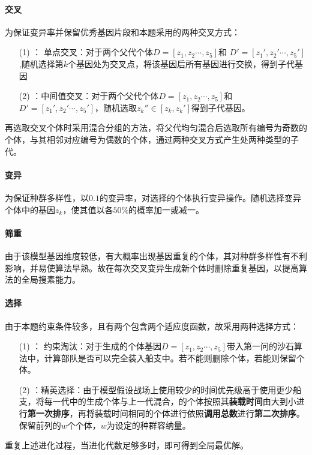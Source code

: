 \documentclass{whutmod}
\begin{document}
	 \paragraph{交叉}
	 为保证变异率并保留优秀基因片段和本题采用的两种交叉方式：
	\begin{itemize}
	\item [(1)]： 单点交叉：对于两个父代个体$D=[z_{1},z_{2}\cdots,z_{5}]$和	$D'=[z_{1}',z_{2}'\cdots,z_{5}']$,随机选择第$k$个基因处为交叉点，将该基因后所有基因进行交换，得到子代基因
	\item [(2)]：中间值交叉：对于两个父代个体$D=[z_{1},z_{2}\cdots,z_{5}]$和	$D'=[z_{1}',z_{2}'\cdots,z_{5}']$，随机选取$z_{k}''\in [z_{k},z_{k}']$得到子代基因。
    \end{itemize}
    再选取交叉个体时采用混合分组的方法，将父代均匀混合后选取所有编号为奇数的个体，与其相邻对应编号为偶数的个体，通过两种交叉方式产生处两种类型的子代。
     \paragraph{变异}
     为保证种群多样性，以$0.1$的变异率，对选择的个体执行变异操作。随机选择变异个体中的基因$z_{k}$，使其值以各$50\%$的概率加一或减一。
     \paragraph{筛重}
     由于该模型基因维度较低，有大概率出现基因重复的个体，其对种群多样性有不利影响，并易使算法早熟。故在每次交叉变异生成新个体时删除重复基因，以提高算法的全局搜素能力。
     \paragraph{选择}
     由于本题约束条件较多，且有两个包含两个适应度函数，故采用两种选择方式：
     \begin{itemize}
     \item [(1)]： 约束淘汰：对于生成的个体基因$D=[z_{1},z_{2}\cdots,z_{5}]$带入第一问的沙石算法中，计算部队是否可以完全装入船支中。若不能则删除个体，若能则保留个体。
     \item [(2)]：精英选择：由于模型假设战场上使用较少的时间优先级高于使用更少船支，将每一代中的生成个体与上一代混合，的个体按照其\textbf{装载时间}由大到小进行\textbf{第一次排序}，再将装载时间相同的个体进行依照\textbf{调用总数}进行\textbf{第二次排序}。保留前列的$w$个个体，$w$为设定的种群容纳量。
     \end{itemize}
     重复上述进化过程，当进化代数足够多时，即可得到全局最优解。
 
\end{document}
